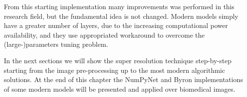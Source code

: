 \documentclass{standalone}
\begin{document}
From this starting implementation many improvements was performed in this research field, but the fundamental idea is not changed.
Modern models simply have a greater number of layers, due to the increasing computational power availability, and they use appropriated workaround to overcome the (large-)parameters tuning problem.

In the next sections we will show the super resolution technique step-by-step starting from the image pre-processing up to the most modern algorithmic solutions.
At the end of this chapter the \textsf{NumPyNet} and \textsf{Byron} implementations of some modern models will be presented and applied over biomedical images.

\end{document}
